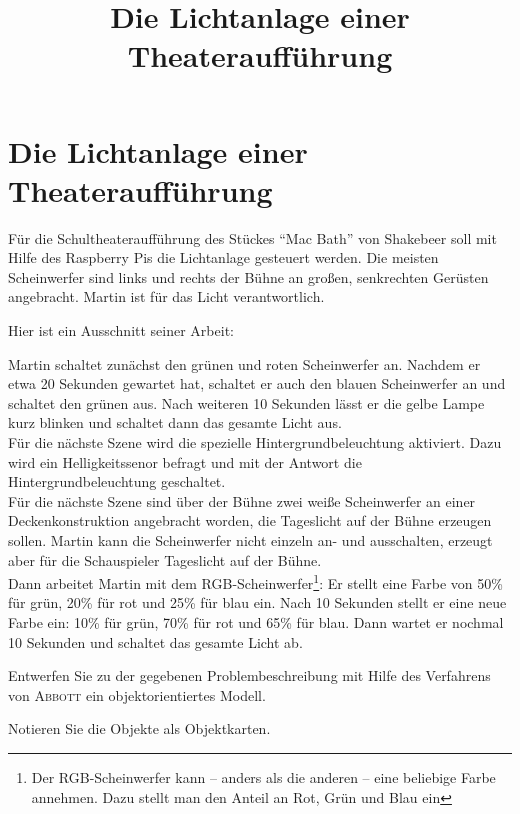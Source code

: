 \documentclass[11pt, a4paper]{scrartcl}
\title{Die Lichtanlage einer Theateraufführung}
\begin{document}
\section*{Die Lichtanlage einer Theateraufführung}
Für die Schultheateraufführung des Stückes \enquote{Mac Bath} von Shakebeer soll mit Hilfe des Raspberry Pis die Lichtanlage gesteuert werden. Die meisten Scheinwerfer sind links und rechts der Bühne an großen, senkrechten Gerüsten angebracht. Martin ist für das Licht verantwortlich.

\vspace{0.5cm}

Hier ist ein Ausschnitt seiner Arbeit:

\begin{mdframed}
Martin schaltet zunächst den grünen und roten Scheinwerfer an. Nachdem er etwa 20 Sekunden gewartet hat, schaltet er auch den blauen Scheinwerfer an und schaltet den grünen aus. Nach weiteren 10 Sekunden lässt er die gelbe Lampe kurz blinken und schaltet dann das gesamte Licht aus.\\

Für die nächste Szene wird die spezielle Hintergrundbeleuchtung aktiviert. Dazu wird ein Helligkeitssenor befragt und mit der Antwort die Hintergrundbeleuchtung geschaltet.\\

Für die nächste Szene sind über der Bühne zwei weiße Scheinwerfer an einer Deckenkonstruktion angebracht worden, die Tageslicht auf der Bühne erzeugen sollen. Martin kann die Scheinwerfer nicht einzeln an- und ausschalten, erzeugt aber für die Schauspieler Tageslicht auf der Bühne.\\

Dann arbeitet Martin mit dem RGB-Scheinwerfer\footnote{Der RGB-Scheinwerfer kann -- anders als die anderen -- eine beliebige Farbe annehmen. Dazu stellt man den Anteil an Rot, Grün und Blau ein}: Er stellt eine Farbe von 50\% für grün, 20\% für rot und 25\% für blau ein. Nach 10 Sekunden stellt er eine neue Farbe ein: 10\% für grün, 70\% für rot und 65\% für blau. Dann wartet er nochmal 10 Sekunden und schaltet das gesamte Licht ab.\\
\end{mdframed}

\vfill

\begin{aufgabe}
Entwerfen Sie zu der gegebenen Problembeschreibung mit Hilfe des Verfahrens von \textsc{Abbott} ein objektorientiertes Modell. 
\end{aufgabe}

\begin{aufgabe}
Notieren Sie die Objekte als Objektkarten.
\end{aufgabe}
\end{document}
